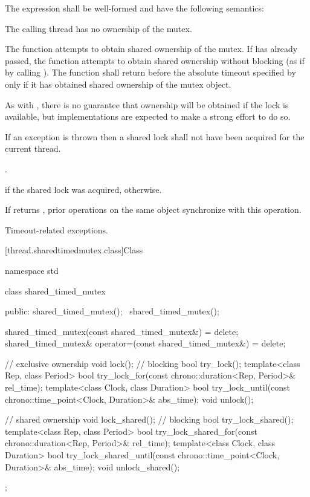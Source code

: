 \pnum
The expression  shall be well-formed
and have the following semantics:

\begin{itemdescr}
\pnum
\requires The calling thread has no ownership of the mutex.

\pnum
\effects The function attempts to obtain shared ownership of the mutex. If
 has already passed, the function attempts to obtain shared
ownership without blocking (as if by calling ). The
function shall return before the absolute timeout
specified by  only if it has obtained shared ownership of the
mutex object. \begin{note} As with , there is no guarantee that
ownership will be obtained if the lock is available, but implementations are
expected to make a strong effort to do so. \end{note}
If an exception is thrown then a shared lock shall not have been acquired for
the current thread.

\pnum
\returntype {}.

\pnum
\returns {} if the shared lock was acquired,  otherwise.

\pnum
\sync If  returns , prior
 operations on the same object synchronize
with this operation.

\pnum
\throws Timeout-related exceptions.
\end{itemdescr}

[thread.sharedtimedmutex.class]{Class }

%
\begin{codeblock}
namespace std {
  class shared_timed_mutex {
  public:
    shared_timed_mutex();
    ~shared_timed_mutex();

    shared_timed_mutex(const shared_timed_mutex&) = delete;
    shared_timed_mutex& operator=(const shared_timed_mutex&) = delete;

    // exclusive ownership
    void lock();                // blocking
    bool try_lock();
    template<class Rep, class Period>
      bool try_lock_for(const chrono::duration<Rep, Period>& rel_time);
    template<class Clock, class Duration>
      bool try_lock_until(const chrono::time_point<Clock, Duration>& abs_time);
    void unlock();

    // shared ownership
    void lock_shared();         // blocking
    bool try_lock_shared();
    template<class Rep, class Period>
      bool try_lock_shared_for(const chrono::duration<Rep, Period>& rel_time);
    template<class Clock, class Duration>
      bool try_lock_shared_until(const chrono::time_point<Clock, Duration>& abs_time);
    void unlock_shared();
  };
}
\end{codeblock}

